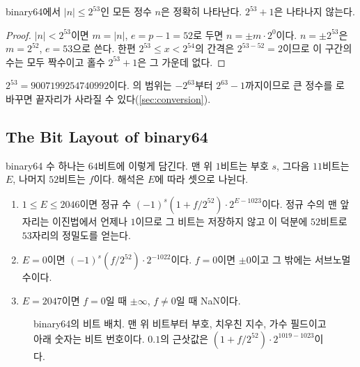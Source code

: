 \begin{proposition}
\label{prop:fp-integers}
binary64에서 $|n|\le2^{53}$인 모든 정수 $n$은 정확히 나타난다. $2^{53}+1$은 나타나지 않는다.
\end{proposition}

\begin{proof}
$|n|<2^{53}$이면 $m=|n|$, $e=p-1=52$로 두면 $n=\pm m\cdot2^0$이다. $n=\pm2^{53}$은 $m=2^{52}$, $e=53$으로 쓴다. 한편 $2^{53}\le x<2^{54}$의 간격은 $2^{53-52}=2$이므로 이 구간의 수는 모두 짝수이고 홀수 $2^{53}+1$은 그 가운데 없다.
\end{proof}

$2^{53}=9007199254740992$이다. 의 범위는 $-2^{63}$부터 $2^{63}-1$까지이므로 큰 정수를 로 바꾸면 끝자리가 사라질 수 있다(\cref{sec:conversion}).

\subsection{The Bit Layout of binary64}

binary64 수 하나는 $64$비트에 이렇게 담긴다. 맨 위 $1$비트는 부호 $s$, 그다음 $11$비트는  $E$, 나머지 $52$비트는  $f$이다. 해석은 $E$에 따라 셋으로 나뉜다.
\begin{enumerate}
\item $1\le E\le2046$이면 정규 수 $(-1)^s(1+f/2^{52})\cdot2^{E-1023}$이다. 정규 수의 맨 앞자리는 이진법에서 언제나 $1$이므로 그 비트는 저장하지 않고 이  덕분에 $52$비트로 $53$자리의 정밀도를 얻는다.
\item $E=0$이면 $(-1)^s(f/2^{52})\cdot2^{-1022}$이다. $f=0$이면 $\pm0$이고 그 밖에는 서브노멀 수이다.
\item $E=2047$이면 $f=0$일 때 $\pm\infty$, $f\ne0$일 때 NaN이다.
\end{enumerate}
\begin{figure}[htbp]
\centering
{}
\caption{binary64의 비트 배치. 맨 위 비트부터 부호, 치우친 지수, 가수 필드이고 아래 숫자는 비트 번호이다. $0.1$의 근삿값은 $(1+f/2^{52})\cdot2^{1019-1023}$이다.}
\label{fig:bit-layout}
\end{figure}

